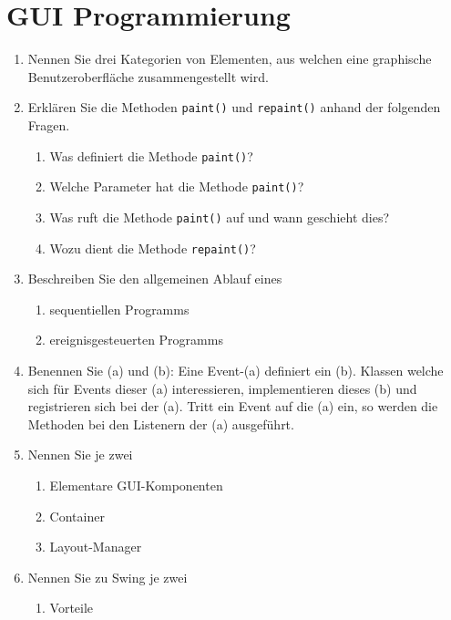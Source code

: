 \newpage
\section{GUI Programmierung}

\begin{enumerate}
    \item Nennen Sie drei Kategorien von Elementen, aus welchen eine
        graphische Benutzeroberfläche zusammengestellt wird.
    \item Erklären Sie die Methoden \verb?paint()? und \verb?repaint()?
        anhand der folgenden Fragen.
        \begin{enumerate}[label=(\alph*)]
            \item Was definiert die Methode \verb?paint()??
            \item Welche Parameter hat die Methode \verb?paint()??
            \item Was ruft die Methode \verb?paint()? auf und wann 
                geschieht dies?
            \item Wozu dient die Methode \verb?repaint()??
        \end{enumerate}
    \item Beschreiben Sie den allgemeinen Ablauf eines 
        \begin{enumerate}[label=(\alph*)]
            \item sequentiellen Programms
            \item ereignisgesteuerten Programms
        \end{enumerate}
    \item Benennen Sie (a) und (b): Eine Event-(a) definiert ein (b).
        Klassen welche sich für Events dieser (a) interessieren, 
        implementieren dieses (b) und registrieren sich bei der (a).
        Tritt ein Event auf die (a) ein, so werden die Methoden bei
        den Listenern der (a) ausgeführt.
    \item Nennen Sie je zwei
        \begin{enumerate}[label=(\alph*)]
            \item Elementare GUI-Komponenten
            \item Container
            \item Layout-Manager
        \end{enumerate}
    \item Nennen Sie zu Swing je zwei 
        \begin{enumerate}[label=(\alph*)]
            \item Vorteile

\end{enumerate}
\end{enumerate}
